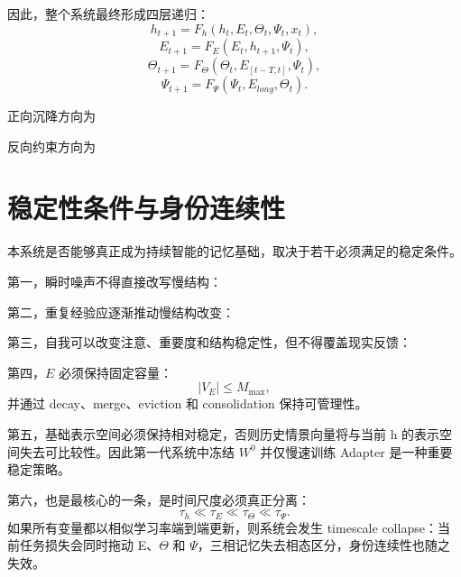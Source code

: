 因此，整个系统最终形成四层递归：
\[
h_{t+1}
=
F_h
\left(
h_t,E_t,\Theta_t,\Psi_t,x_t
\right),
\]
\[
E_{t+1}
=
F_E
\left(
E_t,h_{t+1},\Psi_t
\right),
\]
\[
\Theta_{t+1}
=
F_\Theta
\left(
\Theta_t,E_{[t-T,t]},\Psi_t
\right),
\]
\[
\Psi_{t+1}
=
F_\Psi
\left(
\Psi_t,E_{long},\Theta_t
\right).
\]

正向沉降方向为
\begin{statementbox}
\centering
{}
\end{statementbox}
反向约束方向为
\begin{statementbox}
\centering
{}
\end{statementbox}

\section{稳定性条件与身份连续性}

本系统是否能够真正成为持续智能的记忆基础，取决于若干必须满足的稳定条件。

第一，瞬时噪声不得直接改写慢结构：
\begin{statementbox}
\centering
{}
\end{statementbox}

第二，重复经验应逐渐推动慢结构改变：
\begin{statementbox}
\centering
{}
\end{statementbox}

第三，自我可以改变注意、重要度和结构稳定性，但不得覆盖现实反馈：
\begin{statementbox}
\centering
{}
\end{statementbox}

第四，$E$ 必须保持固定容量：
\[
\boxed{
|V_E|
\leq
M_{\max},
}
\]
并通过 decay、merge、eviction 和 consolidation 保持可管理性。

第五，基础表示空间必须保持相对稳定，否则历史情景向量将与当前 h 的表示空间失去可比较性。因此第一代系统中冻结 $W^0$ 并仅慢速训练 Adapter 是一种重要稳定策略。

第六，也是最核心的一条，是时间尺度必须真正分离：
\[
\boxed{
\tau_h
\ll
\tau_E
\ll
\tau_\Theta
\ll
\tau_\Psi.
}
\]
如果所有变量都以相似学习率端到端更新，则系统会发生 timescale collapse：当前任务损失会同时拖动 E、$\Theta$ 和 $\Psi$，三相记忆失去相态区分，身份连续性也随之失效。

